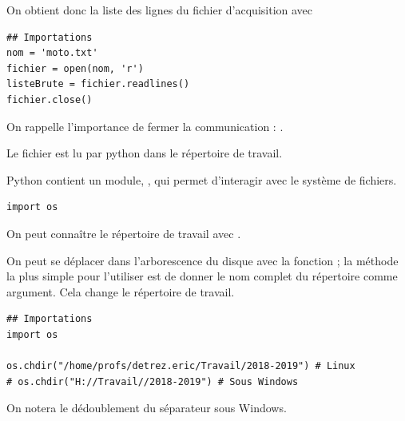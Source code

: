 On obtient donc la liste des lignes du fichier d'acquisition avec
\begin{lstlisting}
## Importations
nom = 'moto.txt'
fichier = open(nom, 'r')
listeBrute = fichier.readlines()
fichier.close()
\end{lstlisting}
On rappelle l'importance de fermer la communication : .

\medskip

Le fichier est lu par python dans le répertoire de travail.

Python contient un module, , qui permet d'interagir avec le système de fichiers. 
\begin{lstlisting}
import os 
\end{lstlisting}

On peut connaître le répertoire de travail avec .

On peut se déplacer dans l'arborescence du disque avec la fonction  ; la méthode la plus simple pour l'utiliser est de donner le nom complet du répertoire comme argument. Cela change le répertoire de travail.

\begin{lstlisting}
## Importations
import os 

os.chdir("/home/profs/detrez.eric/Travail/2018-2019") # Linux
# os.chdir("H://Travail//2018-2019") # Sous Windows
\end{lstlisting}
On notera le dédoublement du séparateur  sous Windows.

\medskip

